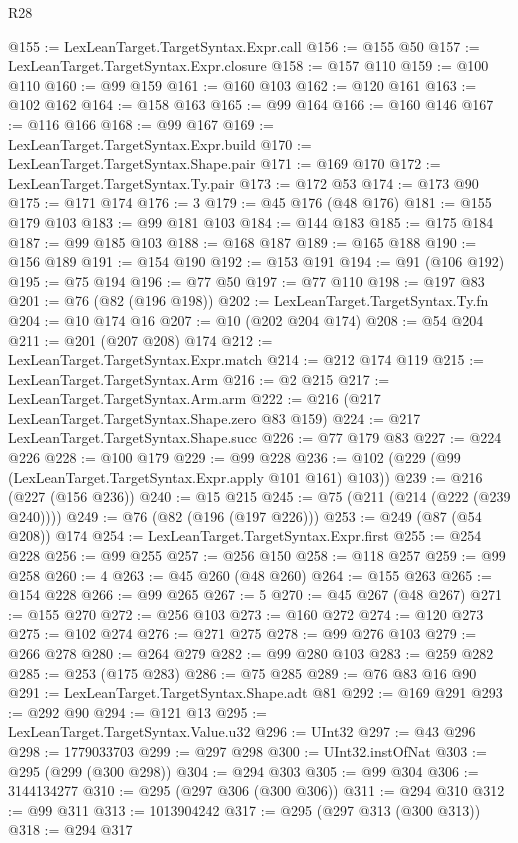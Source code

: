\begin{lexlean}{R28}
\begin{coremodule}
@155 := LexLeanTarget.TargetSyntax.Expr.call
@156 := @155 @50
@157 := LexLeanTarget.TargetSyntax.Expr.closure
@158 := @157 @110
@159 := @100 @110
@160 := @99 @159
@161 := @160 @103
@162 := @120 @161
@163 := @102 @162
@164 := @158 @163
@165 := @99 @164
@166 := @160 @146
@167 := @116 @166
@168 := @99 @167
@169 := LexLeanTarget.TargetSyntax.Expr.build
@170 := LexLeanTarget.TargetSyntax.Shape.pair
@171 := @169 @170
@172 := LexLeanTarget.TargetSyntax.Ty.pair
@173 := @172 @53
@174 := @173 @90
@175 := @171 @174
@176 := 3
@179 := @45 @176 (@48 @176)
@181 := @155 @179 @103
@183 := @99 @181 @103
@184 := @144 @183
@185 := @175 @184
@187 := @99 @185 @103
@188 := @168 @187
@189 := @165 @188
@190 := @156 @189
@191 := @154 @190
@192 := @153 @191
@194 := @91 (@106 @192)
@195 := @75 @194
@196 := @77 @50
@197 := @77 @110
@198 := @197 @83
@201 := @76 (@82 (@196 @198))
@202 := LexLeanTarget.TargetSyntax.Ty.fn
@204 := @10 @174 @16
@207 := @10 (@202 @204 @174)
@208 := @54 @204
@211 := @201 (@207 @208) @174
@212 := LexLeanTarget.TargetSyntax.Expr.match
@214 := @212 @174 @119
@215 := LexLeanTarget.TargetSyntax.Arm
@216 := @2 @215
@217 := LexLeanTarget.TargetSyntax.Arm.arm
@222 := @216 (@217 LexLeanTarget.TargetSyntax.Shape.zero @83 @159)
@224 := @217 LexLeanTarget.TargetSyntax.Shape.succ
@226 := @77 @179 @83
@227 := @224 @226
@228 := @100 @179
@229 := @99 @228
@236 := @102 (@229 (@99 (LexLeanTarget.TargetSyntax.Expr.apply @101 @161) @103))
@239 := @216 (@227 (@156 @236))
@240 := @15 @215
@245 := @75 (@211 (@214 (@222 (@239 @240))))
@249 := @76 (@82 (@196 (@197 @226)))
@253 := @249 (@87 (@54 @208)) @174
@254 := LexLeanTarget.TargetSyntax.Expr.first
@255 := @254 @228
@256 := @99 @255
@257 := @256 @150
@258 := @118 @257
@259 := @99 @258
@260 := 4
@263 := @45 @260 (@48 @260)
@264 := @155 @263
@265 := @154 @228
@266 := @99 @265
@267 := 5
@270 := @45 @267 (@48 @267)
@271 := @155 @270
@272 := @256 @103
@273 := @160 @272
@274 := @120 @273
@275 := @102 @274
@276 := @271 @275
@278 := @99 @276 @103
@279 := @266 @278
@280 := @264 @279
@282 := @99 @280 @103
@283 := @259 @282
@285 := @253 (@175 @283)
@286 := @75 @285
@289 := @76 @83 @16 @90
@291 := LexLeanTarget.TargetSyntax.Shape.adt @81
@292 := @169 @291
@293 := @292 @90
@294 := @121 @13
@295 := LexLeanTarget.TargetSyntax.Value.u32
@296 := UInt32
@297 := @43 @296
@298 := 1779033703
@299 := @297 @298
@300 := UInt32.instOfNat
@303 := @295 (@299 (@300 @298))
@304 := @294 @303
@305 := @99 @304
@306 := 3144134277
@310 := @295 (@297 @306 (@300 @306))
@311 := @294 @310
@312 := @99 @311
@313 := 1013904242
@317 := @295 (@297 @313 (@300 @313))
@318 := @294 @317

\end{coremodule}
\end{lexlean}
